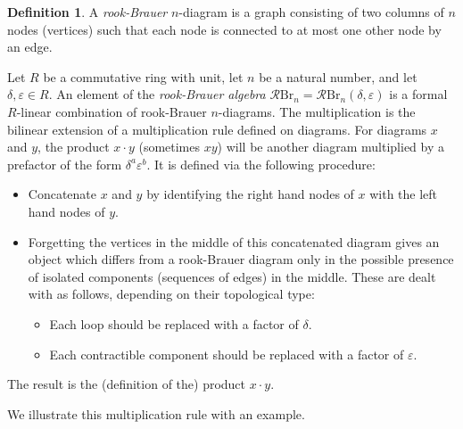 \documentclass[12pt]{amsart}
\theoremstyle{plain}
\theoremstyle{definition} \newtheorem{definition}[theorem]{Definition}
\theoremstyle{plain}
\theoremstyle{plain} \newtheorem{proposition}[theorem]{Proposition}
\theoremstyle{plain} \newtheorem{conjecture}[theorem]{Conjecture}
\theoremstyle{plain} \newtheorem{corollary}[theorem]{Corollary}
\theoremstyle{remark} \newtheorem{claim}[theorem]{Claim}
\theoremstyle{remark} \newtheorem{remark}[theorem]{Remark}
\theoremstyle{remark} \newtheorem{example}[theorem]{Example}
\theoremstyle{remark} \newtheorem{comment}[theorem]{Comment}
\theoremstyle{definition} \newtheorem{question}[theorem]{Question}
\newcommand{\rook}{\mathcal{R}}
\newcommand{\Brauer}{\mathrm{Br}}
\begin{document}
\begin{definition} A \emph{rook-Brauer} $n$-diagram is a graph consisting of two columns of $n$ nodes (vertices) such that each node is connected to at most one other node by an edge.

Let $R$ be a commutative ring with unit, let $n$ be a natural number, and let $\delta, \varepsilon \in R$. An element of the \emph{rook-Brauer algebra} $\rook \Brauer_n = \rook \Brauer_n(\delta, \varepsilon)$ is a formal $R$-linear combination of rook-Brauer $n$-diagrams. The multiplication is the bilinear extension of a multiplication rule defined on diagrams. For diagrams $x$ and $y$, the product $x \cdot y$ (sometimes $xy$) will be another diagram multiplied by a prefactor of the form $\delta^a \varepsilon^b$. It is defined via the following procedure:
\begin{itemize}
    \item Concatenate $x$ and $y$ by identifying the right hand nodes of $x$ with the left hand nodes of $y$.
    \item Forgetting the vertices in the middle of this concatenated diagram gives an object which differs from a rook-Brauer diagram only in the possible presence of isolated components (sequences of edges) in the middle. These are dealt with as follows, depending on their topological type:
    \begin{itemize}
    \item Each loop should be replaced with a factor of $\delta$.
    \item Each contractible component should be replaced with a factor of $\varepsilon$.
\end{itemize}
\end{itemize}
The result is the (definition of the) product $x \cdot y$.
\end{definition}

We illustrate this multiplication rule with an example.
\end{document}
